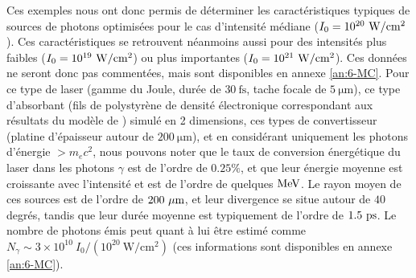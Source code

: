 \begin{refsection}
Ces exemples nous ont donc permis de déterminer les caractéristiques typiques de sources de photons optimisées pour le cas d'intensité médiane ($I_0=10^{20} ~ \rm W/cm^2$). Ces caractéristiques se retrouvent néanmoins aussi pour des intensités plus faibles ($I_0=10^{19} ~ \rm W/cm^2$) ou plus importantes ($I_0=10^{21} ~ \rm W/cm^2$). Ces données ne seront donc pas commentées, mais sont disponibles en annexe \ref{an:6-MC}. Pour ce type de laser (gamme du Joule, durée de $30 ~ \si{\fs}$, tache focale de $5 ~ \si{\um}$), ce type d'absorbant (fils de polystyrène de densité électronique correspondant aux résultats du modèle de \cite{pazzaglia_2020}) simulé en 2 dimensions, ces types de convertisseur (platine d'épaisseur autour de $200 ~\si{\um}$), et en considérant uniquement les photons d'énergie $>m_e c^2$, nous pouvons noter que le taux de conversion énergétique du laser dans les photons $\gamma$ est de l'ordre de $0.25 \%$, et que leur énergie moyenne est croissante avec l'intensité et est de l'ordre de quelques $\rm MeV$. Le rayon moyen de ces sources est de l'ordre de $200 ~ \rm \mu m$, et leur divergence se situe autour de $40$ degrés, tandis que leur durée moyenne est typiquement de l'ordre de $1.5 ~ \rm ps$. Le nombre de photons émis peut quant à lui être estimé comme $N_\gamma \sim 3 \times 10^{10} ~ I_0/(10^{20} ~ \si{\W\per\cm^2})$ (ces informations sont disponibles en annexe \ref{an:6-MC}).


\end{refsection}
